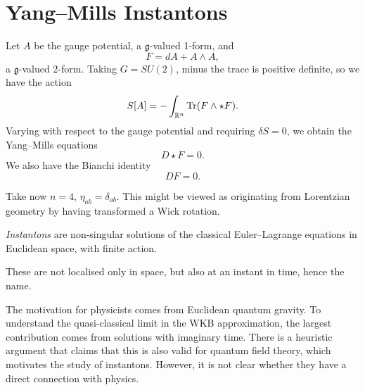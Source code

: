 
\section{Yang--Mills Instantons}%
\label{sec:yang_mills_instantons}

Let $A$ be the gauge potential, a $\mathfrak{g}$-valued 1-form, and 
\begin{equation}
  \label{eq:13-F}
  F = dA + A \wedge A,
\end{equation}
a $\mathfrak{g}$-valued $2$-form.
Taking $G = SU(2)$, minus the trace is positive definite, so we have the action
\begin{equation}
  S[A] = - \int_{\mathbb{R}^n} \Tr(F \wedge \star F).
\end{equation}
Varying with respect to the gauge potential and requiring $\delta S = 0$, we obtain the Yang--Mills equations
\begin{equation}
  D \star F = 0.
\end{equation}
We also have the Bianchi identity
\begin{equation}
  D F = 0.
\end{equation}

Take now $n = 4$, $\eta_{ab} = \delta_{ab}$.  This might be viewed as originating from Lorentzian geometry by having transformed a Wick rotation.
\begin{definition}[instantons]
  \emph{Instantons} are non-singular solutions of the classical Euler--Lagrange equations in Euclidean space, with finite action.
\end{definition}
These are not localised only in space, but also at an instant in time, hence the name.

The motivation for physicists comes from Euclidean quantum gravity. To understand the quasi-classical limit in the WKB approximation, the largest contribution comes from solutions with imaginary time. There is a heuristic argument that claims that this is also valid for quantum field theory, which motivates the study of instantons. However, it is not clear whether they have a direct connection with physics.

